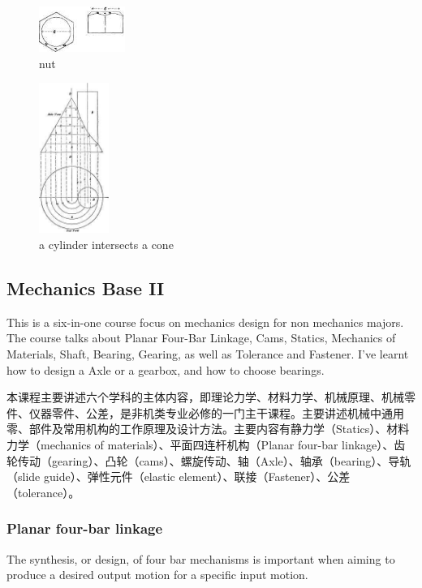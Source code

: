 \begin{figure}
  \centering
  \includegraphics[width=1.1in]{fig/drawing-0121-1.jpg}
  \caption{nut}\label{fig_nut}
\end{figure}

\begin{figure}
  \centering
  \includegraphics[width=0.9in]{fig/drawing-0189-1.jpg}
  \caption{a cylinder intersects a cone}\label{fig_projection}
\end{figure}

\subsection{Mechanics Base II}
This is a six-in-one course focus on mechanics design for non mechanics majors. The course talks about Planar Four-Bar Linkage, Cams, Statics, Mechanics of Materials, Shaft, Bearing, Gearing, as well as Tolerance and Fastener. I've learnt how to design a Axle or a gearbox, and how to choose bearings.

本课程主要讲述六个学科的主体内容，即理论力学、材料力学、机械原理、机械零件、仪器零件、公差，是非机类专业必修的一门主干课程。主要讲述机械中通用零、部件及常用机构的工作原理及设计方法。主要内容有静力学（Statics）、材料力学（mechanics of materials）、平面四连杆机构（Planar four-bar linkage）、齿轮传动（gearing）、凸轮（cams）、螺旋传动、轴（Axle）、轴承（bearing）、导轨（slide guide）、弹性元件（elastic element）、联接（Fastener）、公差（tolerance）。

\subsubsection{Planar four-bar linkage}
The synthesis, or design, of four bar mechanisms is important when aiming to produce a desired output motion for a specific input motion.

